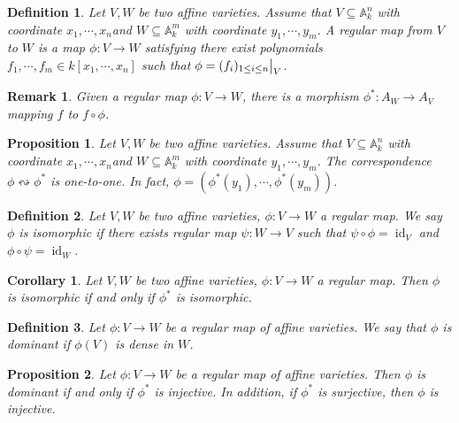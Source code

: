 \documentclass{ctexart}
\newtheorem{definition}{Definition}[section]
\newtheorem{remark}{Remark}[section]
\newtheorem{proposition}{Proposition}[section]
\newtheorem{corollary}{Corollary}[section]
\newcommand{\identity}{\operatorname{id}}
\begin{document}
\begin{definition}
    Let $V, W$ be two affine varieties.
    Assume that $V \subseteq \mathbb{A}_{k}^{n}$ with coordinate $x_{1}, \cdots, x_{n}$and $W \subseteq \mathbb{A}_{k}^{m}$ with coordinate $y_{1}, \cdots, y_{m}$.
    A regular map from $V$ to $W$ is a map $\phi: V \rightarrow W$ satisfying there exist polynomials $f_{1}, \cdots, f_{m}\in k[x_{1}, \cdots, x_{n}]$ such that $\phi = (f_{i})_{1 \le i \le n}\big{|}_{V}$.
\end{definition}
\begin{remark}
    Given a regular map $\phi: V \rightarrow W$, there is a morphism $\phi^{\ast}: A_{W} \rightarrow A_{V}$ mapping $f$ to $f \circ \phi$.
\end{remark}
\begin{proposition}
    Let $V, W$ be two affine varieties.
    Assume that $V \subseteq \mathbb{A}_{k}^{n}$ with coordinate $x_{1}, \cdots, x_{n}$and $W \subseteq \mathbb{A}_{k}^{m}$ with coordinate $y_{1}, \cdots, y_{m}$.
    The correspondence $\phi \leftrightsquigarrow \phi^{\ast}$ is one-to-one.
    In fact, $\phi = (\phi^{\ast}(y_{1}), \cdots, \phi^{\ast}(y_{m}))$.
    \label{Proposition 1.1}
\end{proposition}
\begin{definition}
    Let $V, W$ be two affine varieties, $\phi: V \rightarrow W$ a regular map.
    We say $\phi$ is isomorphic if there exists regular map $\psi: W \rightarrow V$ such that $\psi \circ \phi = \identity_{V}$ and $\phi \circ \psi = \identity_{W}$.
\end{definition}
\begin{corollary}
    Let $V, W$ be two affine varieties, $\phi: V \rightarrow W$ a regular map.
    Then $\phi$ is isomorphic if and only if $\phi^{\ast}$ is isomorphic.
    \label{Corollary 1.3}
\end{corollary}
\begin{definition}
    Let $\phi: V \rightarrow W$ be a regular map of affine varieties.
    We say that $\phi$ is dominant if $\phi(V)$ is dense in $W$.
\end{definition}
\begin{proposition}
    Let $\phi: V \rightarrow W$ be a regular map of affine varieties.
    Then $\phi$ is dominant if and only if $\phi^{\ast}$ is injective.
    In addition, if $\phi^{\ast}$ is surjective, then $\phi$ is injective.
    \label{Proposition 1.2}
\end{proposition}
\end{document}
